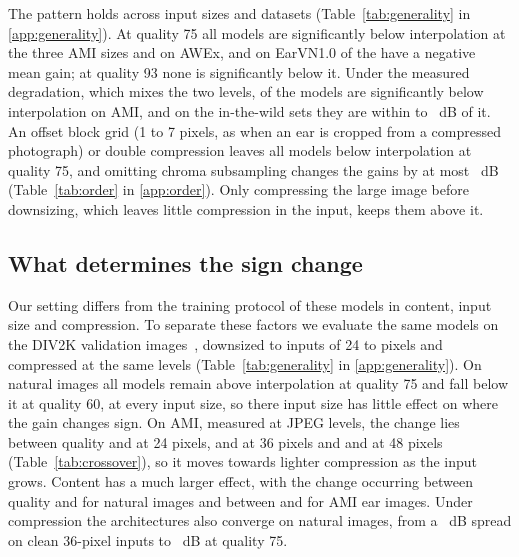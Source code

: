 The pattern holds across input sizes and datasets (Table~\ref{tab:generality} in \ref{app:generality}). At quality 75 all models are significantly below interpolation at the three AMI sizes and on AWEx, and on EarVN1.0 \EarvnQLowBelow{} of the \NPub{} have a negative mean gain; at quality 93 none is significantly below it. Under the measured degradation, which mixes the two levels, \AmiEstSig{} of the \NPub{} models are significantly below interpolation on AMI, and on the in-the-wild sets they are within \WildEstGainMin{} to \WildEstGainMax{}~dB of it. An offset block grid (1 to 7 pixels, as when an ear is cropped from a compressed photograph) or double compression leaves all models below interpolation at quality 75, and omitting chroma subsampling changes the gains by at most \OrdChromaMax{}~dB (Table~\ref{tab:order} in \ref{app:order}). Only compressing the large image before downsizing, which leaves little compression in the input, keeps them above it.


\subsection{What determines the sign change}
\label{sec:natural}
Our setting differs from the training protocol of these models in content, input size and compression. To separate these factors we evaluate the same models on the \NatN{} DIV2K validation images~\cite{agustsson2017div2k}, downsized to inputs of 24 to \NatLargePx{} pixels and compressed at the same levels (Table~\ref{tab:generality} in \ref{app:generality}). On natural images all models remain above interpolation at quality 75 and fall below it at quality 60, at every input size, so there input size has little effect on where the gain changes sign. On AMI, measured at \AmiLevels{} JPEG levels, the change lies between quality \CrossGridAmiSLo{} and \CrossGridAmiSHi{} at 24 pixels, \CrossGridAmiMLo{} and \CrossGridAmiMHi{} at 36 pixels and \CrossGridAmiLLo{} and \CrossGridAmiLHi{} at 48 pixels (Table~\ref{tab:crossover}), so it moves towards lighter compression as the input grows. Content has a much larger effect, with the change occurring between quality \CrossGridNatHi{} and \CrossGridNatLo{} for natural images and between \CrossGridAmiHi{} and \CrossGridAmiLo{} for AMI ear images. Under compression the architectures also converge on natural images, from a \NatSpreadCleanS{}~dB spread on clean 36-pixel inputs to \NatSpreadQLowS{}~dB at quality 75.

